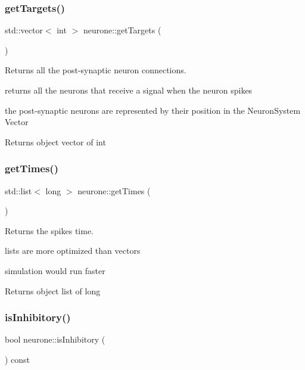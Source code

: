 \subsubsection{\texorpdfstring{get\+Targets()}{getTargets()}}
{\footnotesize\ttfamily std\+::vector$<$ int $>$ neurone\+::get\+Targets (\begin{DoxyParamCaption}{ }\end{DoxyParamCaption})}



Returns all the post-\/synaptic neuron connections. 

returns all the neurons that receive a signal when the neuron spikes

the post-\/synaptic neurons are represented by their position in the Neuron\+System Vector

\begin{DoxyReturn}{Returns}
object vector of int 
\end{DoxyReturn}
\mbox{\label{classneurone_a36c9b4a43331890178cf8ef774cf53f7}} 
\subsubsection{\texorpdfstring{get\+Times()}{getTimes()}}
{\footnotesize\ttfamily std\+::list$<$ long $>$ neurone\+::get\+Times (\begin{DoxyParamCaption}{ }\end{DoxyParamCaption})}



Returns the spikes time. 

lists are more optimized than vectors

simulation would run faster

\begin{DoxyReturn}{Returns}
object list of long 
\end{DoxyReturn}
\mbox{\label{classneurone_ae3f754b75dc3f92cd9964785d4f6b935}} 
\subsubsection{\texorpdfstring{is\+Inhibitory()}{isInhibitory()}}
{\footnotesize\ttfamily bool neurone\+::is\+Inhibitory (\begin{DoxyParamCaption}{ }\end{DoxyParamCaption}) const}



